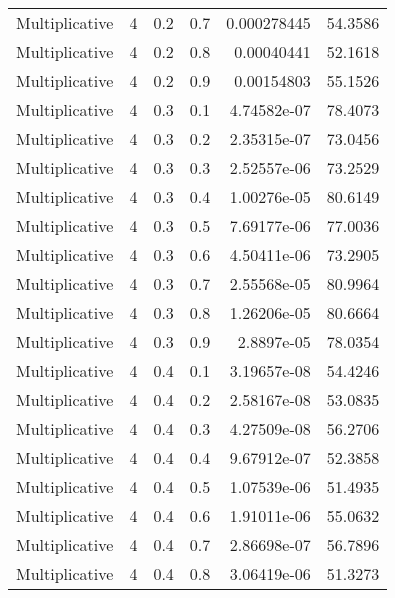 \documentclass{article}
\begin{document}
\begin{longtable}[H]{lrrrrr}
 Multiplicative &       4 &   0.2 &            0.7 &      0.000278445 &         54.3586 \\
 Multiplicative &       4 &   0.2 &            0.8 &      0.00040441  &         52.1618 \\
 Multiplicative &       4 &   0.2 &            0.9 &      0.00154803  &         55.1526 \\
 Multiplicative &       4 &   0.3 &            0.1 &      4.74582e-07 &         78.4073 \\
 Multiplicative &       4 &   0.3 &            0.2 &      2.35315e-07 &         73.0456 \\
 Multiplicative &       4 &   0.3 &            0.3 &      2.52557e-06 &         73.2529 \\
 Multiplicative &       4 &   0.3 &            0.4 &      1.00276e-05 &         80.6149 \\
 Multiplicative &       4 &   0.3 &            0.5 &      7.69177e-06 &         77.0036 \\
 Multiplicative &       4 &   0.3 &            0.6 &      4.50411e-06 &         73.2905 \\
 Multiplicative &       4 &   0.3 &            0.7 &      2.55568e-05 &         80.9964 \\
 Multiplicative &       4 &   0.3 &            0.8 &      1.26206e-05 &         80.6664 \\
 Multiplicative &       4 &   0.3 &            0.9 &      2.8897e-05  &         78.0354 \\
 Multiplicative &       4 &   0.4 &            0.1 &      3.19657e-08 &         54.4246 \\
 Multiplicative &       4 &   0.4 &            0.2 &      2.58167e-08 &         53.0835 \\
 Multiplicative &       4 &   0.4 &            0.3 &      4.27509e-08 &         56.2706 \\
 Multiplicative &       4 &   0.4 &            0.4 &      9.67912e-07 &         52.3858 \\
 Multiplicative &       4 &   0.4 &            0.5 &      1.07539e-06 &         51.4935 \\
 Multiplicative &       4 &   0.4 &            0.6 &      1.91011e-06 &         55.0632 \\
 Multiplicative &       4 &   0.4 &            0.7 &      2.86698e-07 &         56.7896 \\
 Multiplicative &       4 &   0.4 &            0.8 &      3.06419e-06 &         51.3273 \\

\end{longtable}
\end{document}
